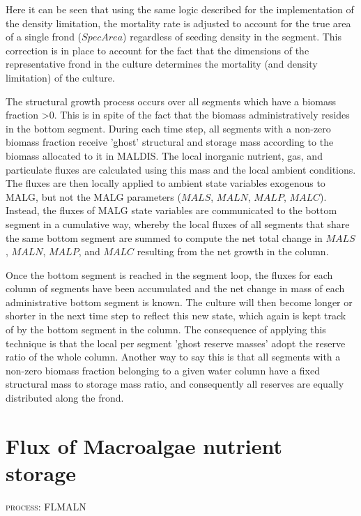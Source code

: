 \documentclass{deltares_manual}
\begin{document}
Here it can be seen that using the same logic described for the implementation of the density limitation, the mortality rate is adjusted to account for the true area of a single frond ($SpecArea$) regardless of seeding density in the segment. This correction is in place to account for the fact that the dimensions of the representative frond in the culture determines the mortality (and density limitation) of the culture.

The structural growth process occurs over all segments which have a biomass fraction \textgreater 0. This is in spite of the fact that the biomass administratively resides in the bottom segment. During each time step, all segments with a non-zero biomass fraction receive 'ghost' structural and storage mass according to the biomass allocated to it in MALDIS. The local inorganic nutrient, gas, and particulate fluxes are calculated using this mass and the local ambient conditions. The fluxes are then locally applied to ambient state variables exogenous to MALG, but not the MALG parameters ($MALS$, $MALN$, $MALP$, $MALC$). Instead, the fluxes of MALG state variables are communicated to the bottom segment in a cumulative way, whereby the local fluxes of all segments that share the same bottom segment are summed to compute the net total change in $MALS$, $MALN$, $MALP$, and $MALC$ resulting from the net growth in the column. 

Once the bottom segment is reached in the segment loop, the fluxes for each column of segments have been accumulated and the net change in mass of each administrative bottom segment is known. The culture will then become longer or shorter in the next time step to reflect this new state, which again is kept track of by the bottom segment in the column. The consequence of applying this technique is that the local per segment 'ghost reserve masses' adopt the reserve ratio of the whole column. Another way to say this is that all segments with a non-zero biomass fraction belonging to a given water column have a fixed structural mass to storage mass ratio, and consequently all reserves are equally distributed along the frond.
\pagebreak

\section{Flux of Macroalgae nutrient storage}
\begin{flushright}
\textsc{process: FLMALN}
\end{flushright}
\end{document}

